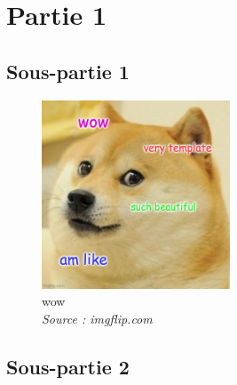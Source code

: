 \section{Partie 1}

\subsection{Sous-partie 1}

\lipsum

\begin{figure}[h]
	\centering
    \includegraphics[width=0.5\textwidth]{images/example.jpg}
	\caption{wow\\\emph{Source : imgflip.com}}
	\label{fig:wow}
\end{figure}

\lipsum

\subsection{Sous-partie 2}

\lipsum
